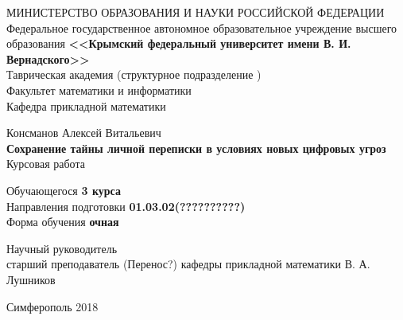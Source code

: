     \begin{titlepage}
    \newpage
	\pagestyle{empty} %
    \begin{center}
    \normalsize МИНИСТЕРСТВО ОБРАЗОВАНИЯ И НАУКИ РОССИЙСКОЙ ФЕДЕРАЦИИ\\ 
    \small  {Федеральное государственное автономное образовательное учреждение высшего образования} 
    \large \textbf{<<Крымский  федеральный  университет имени В. И. Вернадского>>} \\  \vspace{2mm}
    Таврическая академия (структурное подразделение ) \\
    \vspace{2mm}
    Факультет математики и информатики \\
    \vspace{2mm}
    Кафедра прикладной математики 
    \end{center}
    \vspace{3em}

    \begin{center}
	\normalsize Консманов Алексей Витальевич \\
    \LARGE \textbf{Сохранение тайны личной переписки в условиях новых цифровых угроз} \\
    \vspace{1em}
    \normalsize Курсовая работа 
    \end{center}

    \vspace{1em}
    
    \begin{center}
    	\begin{tabbing}	%
    		\hspace{3cm}Обучающегося \hspace{3cm} \textbf{3 курса}\\ %
    		\hspace{3cm}Направления подготовки \hspace{1cm}  \textbf{01.03.02(??????????)}\\
    		\hspace{3cm}Форма обучения \hspace{26mm} \textbf{очная}
    	\end{tabbing}
    
	\vspace {3em}
    \flushleft Научный руководитель \\ старший преподаватель (Перенос?) кафедры прикладной математики \quad В. А. Лушников
	\end{center}
    \vspace{\fill}

    \begin{center}
    Симферополь 2018
    \end{center}

    \end{titlepage}